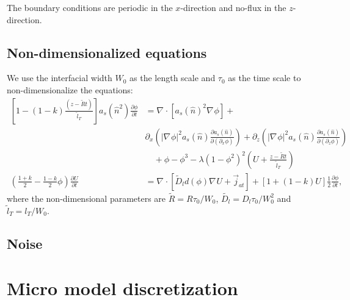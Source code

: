 \documentclass[a4paper,12pt]{article}
\renewcommand{\div}[1]{\nabla_{#1} \cdot}
\newcommand{\grad}[1]{\nabla_{#1}}
\begin{document}
The boundary conditions are periodic in the $x$-direction and no-flux in the $z$-direction.

\subsection{Non-dimensionalized equations}
We use  the interfacial width $W_0$ as the length scale and $\tau_0$ as the time scale to non-dimensionalize the equations:
\begin{align}
 \left[1-(1-k) \frac{(z- \tilde{R} t)}{ \tilde{l}_T} \right] a_s(\hat{n}^2) \frac{\partial \phi}{\partial t} &= 
  \div{} [a_s(\hat{n})^2 \grad{} \phi] + \nonumber  \\  
 & \partial_x \left( |\grad{} \phi|^2 a_s(\hat{n}) \frac{\partial a_s(\hat{n})}{\partial (\partial_x \phi)}  \right)  + 
\partial_z \left( |\grad{} \phi|^2 a_s(\hat{n}) \frac{\partial a_s(\hat{n})}{\partial (\partial_z \phi)}  \right)   \nonumber \\
& \quad + \phi - \phi^3 - \lambda (1-\phi^2)^2 \left(U + \frac{z-\tilde{R} t}{ \tilde{l}_T} \right) \\
\left(\frac{1+k}{2}-\frac{1-k}{2}\phi \right) \frac{\partial U}{\partial t} &= \div{} [\tilde{D}_l d(\phi) \grad{} U + \vec{j}_{at}] + [1+(1-k)U]\frac{1}{2}  \frac{\partial \phi}{\partial t},
\end{align}
where the non-dimensional parameters are  $\tilde{R} = R\tau_0 / W_0$, $\tilde{D_l} = D_l \tau_0 / W_0^2$ and $\tilde{l}_T = l_T / W_0$.



\subsection{Noise}

\section{Micro model discretization}
\end{document}
